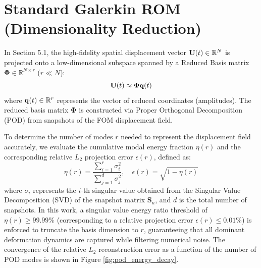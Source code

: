 \section{Standard Galerkin ROM (Dimensionality Reduction)} \label{sec:galerkin_rom}
In Section 5.1, the high-fidelity spatial displacement vector $\mathbf{U}(t) \in \mathbb{R}^N$ is projected onto a low-dimensional subspace spanned by a Reduced Basis matrix $\boldsymbol{\Phi} \in \mathbb{R}^{N \times r}$ ($r \ll N$):
\begin{equation}
    \mathbf{U}(t) \approx \boldsymbol{\Phi} \mathbf{q}(t)
\end{equation}
where $\mathbf{q}(t) \in \mathbb{R}^r$ represents the vector of reduced coordinates (amplitudes). The reduced basis matrix $\boldsymbol{\Phi}$ is constructed via Proper Orthogonal Decomposition (POD) from snapshots of the FOM displacement field. 

To determine the number of modes $r$ needed to represent the displacement field accurately, we evaluate the cumulative modal energy fraction $\eta(r)$ and the corresponding relative $L_2$ projection error $\epsilon(r)$, defined as:
\begin{equation}
    \eta(r) = \frac{\sum_{i=1}^{r} \sigma_i^2}{\sum_{j=1}^{d} \sigma_j^2}, \quad \epsilon(r) = \sqrt{1 - \eta(r)}
\end{equation}
where $\sigma_i$ represents the $i$-th singular value obtained from the Singular Value Decomposition (SVD) of the snapshot matrix $\mathbf{S}_u$, and $d$ is the total number of snapshots. In this work, a singular value energy ratio threshold of $\eta(r) \ge 99.99\%$ (corresponding to a relative projection error $\epsilon(r) \le 0.01\%$) is enforced to truncate the basis dimension to $r$, guaranteeing that all dominant deformation dynamics are captured while filtering numerical noise. The convergence of the relative $L_2$ reconstruction error as a function of the number of POD modes is shown in Figure \ref{fig:pod_energy_decay}.

